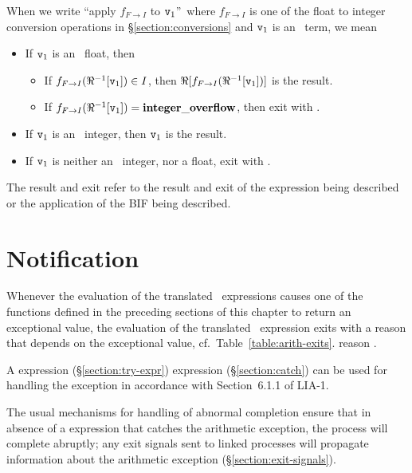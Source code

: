 When we write ``apply $f_{F\to I}$ to ${\tt{\sl v}}_1$''\ where
$f_{F\to I}$ is one of the float to integer conversion operations in
\S\ref{section:conversions} and ${\tt{\sl v}}_1$ is an
\Erlang\ term, we mean
\begin{itemize}
\item If ${\tt{\sl v}}_1$ is an \Erlang\ float, then
\begin{itemize}
\item If $f_{F\to I}(\Re^{-1}[{\tt{\sl v}}_1])\in I$, then $\Re[f_{F\to I}(\Re^{-1}[{\tt{\sl v}}_1])]$ is the result.
\item If $f_{F\to I}(\Re^{-1}[{\tt{\sl v}}_1])={\bf integer\_overflow}$, then exit with .
\end{itemize}
\item If ${\tt{\sl v}}_1$ is an \Erlang\ integer, then ${\tt{\sl v}}_1$ is the result.
\item If ${\tt{\sl v}}_1$ is neither an \Erlang\ integer, nor a float, exit with .
\end{itemize}

The result and exit refer to the result and exit of the expression
being described or the application of the BIF being described.
\fi %

\section{Notification}


Whenever the evaluation of the translated \Erlang\ expressions causes
one of the functions defined in the preceding sections of this chapter
to return an exceptional value, the evaluation of the translated
\Erlang\ expression exits with
\ifStd
a reason that depends on the
exceptional value, cf.~Table~\ref{table:arith-exits}.
\fi
\ifOld
reason .
\fi

A \ifStd{} expression (\S\ref{section:try-expr}) \else
{} expression (\S\ref{section:catch}) \fi
can be used for handling
the exception in accordance with Section~6.1.1 of LIA-1.

The usual mechanisms for handling of abnormal completion ensure that
in absence of a \ifStd{} \else{} \fi expression that catches the arithmetic
exception, the process will complete abruptly; any exit signals sent
to linked processes will propagate information about the arithmetic
exception (\S\ref{section:exit-signals}).


